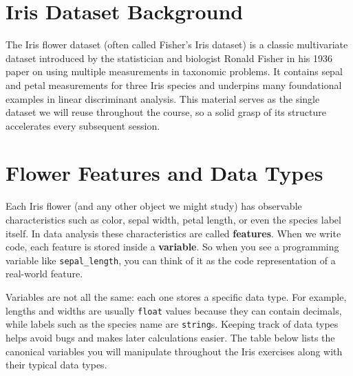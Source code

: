 \section{Iris Dataset Background}

The Iris flower dataset (often called Fisher's Iris dataset) is a classic multivariate dataset introduced by the statistician and biologist Ronald Fisher in his 1936 paper on using multiple measurements in taxonomic problems. It contains sepal and petal measurements for three Iris species and underpins many foundational examples in linear discriminant analysis. This material serves as the single dataset we will reuse throughout the course, so a solid grasp of its structure accelerates every subsequent session.

\section{Flower Features and Data Types}

Each Iris flower (and any other object we might study) has observable characteristics such as color, sepal width, petal length, or even the species label itself. In data analysis these characteristics are called \textbf{features}. When we write code, each feature is stored inside a \textbf{variable}. So when you see a programming variable like \texttt{sepal\_length}, you can think of it as the code representation of a real-world feature.

Variables are not all the same: each one stores a specific data type. For example, lengths and widths are usually \texttt{float} values because they can contain decimals, while labels such as the species name are \texttt{string}s. Keeping track of data types helps avoid bugs and makes later calculations easier. The table below lists the canonical variables you will manipulate throughout the Iris exercises along with their typical data types.

